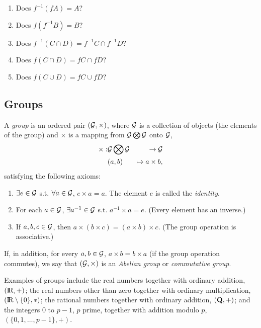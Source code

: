 \begin{Exercise}
        \begin{enumerate}
                \item Does $f^{-1}(fA) = A$?
                \item Does $f(f^{-1}B) = B$?
                \item Does $f^{-1}(C \cap D) = f^{-1}C \cap f^{-1} D$?
                \item Does $f(C \cap D) = fC \cap fD$?
                \item Does $f(C \cup D) = fC \cup fD$?
        \end{enumerate}
\end{Exercise}

\subsection{Groups}
\begin{Definition}
        A {\em group\/} is an ordered pair $({\cal G}, \times)$, where ${\cal G}$ is
        a collection of objects (the elements of the group) and $\times$ is a mapping
        from ${\cal G} \bigotimes {\cal G}$ onto ${\cal G}$,
        \begin{eqnarray*}
                \times : & {\cal G} \bigotimes {\cal G} & \rightarrow {\cal G} \\
                         & (a, b) & \mapsto a \times b,
        \end{eqnarray*}
        satisfying the following axioms:
        \begin{enumerate}
                \item $\exists e \in {\cal G}$ s.t. $\forall a \in {\cal G}$, $e \times a = a$.
                        The element $e$ is called the {\em identity\/}.
                \item For each $a \in {\cal G}$, $\exists a^{-1} \in {\cal G}$ s.t. $a^{-1}\times a = e$.
                        (Every element has an inverse.)
                \item If $a, b, c \in {\cal G}$, then $a \times (b \times c) = (a \times b)\times c$.
                        (The group operation is associative.)
        \end{enumerate}
        If, in addition, for every $a, b \in {\cal G}$,  $a \times b = b \times a$ (if the group
        operation commutes), we say that $({\cal G}, \times)$ is an {\em Abelian group\/}
        or {\em commutative group\/}.
\end{Definition}

Examples of groups include the real numbers together with ordinary addition, $(\hbox{I\kern-.17em\hbox{R}}, +)$;
the real numbers other than zero together with ordinary multiplication,
$(\hbox{I\kern-.17em\hbox{R}} \setminus \{0\}, *)$; the rational numbers together with ordinary addition,
$({\bf Q}, +)$; and the integers 0 to $p-1$, $p$ prime, together with addition modulo $p$,
$( \{0, 1, \ldots, p-1\}, +)$.

